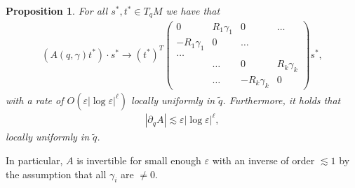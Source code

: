 \documentclass[JEP,XML,SOM,Unicode,published]{cedram}
\let\epsilon\varepsilon
\newtheorem{proposition}[theorem]{Proposition}
\theoremstyle{definition}
\let\de\partial
\let\eps\epsilon
\begin{document}
\begin{proposition}\label{conv A}
For all $s^*,t^*\in T_qM$ we have that
\begin{align*}(A(q,\gamma)t^*)\cdot s^*\to (t^*)^T\begin{pmatrix} 0 & R_1\gamma_1 &0 &\dots\\
-R_1\gamma_1 & 0 & \dots\\
\dots\\
 & \dots & 0 & R_k\gamma_k\\
 &\dots & -R_k\gamma_k & 0\end{pmatrix}s^*,
\end{align*}
with a rate of $O(\eps|{\log\eps}|^\ell)$ locally uniformly in $\tilde{q}$.
Furthermore, it holds that
\begin{align*}
\left|\de_q A\right|\lesssim \eps|{\log\eps}|^\ell,
\end{align*}
locally uniformly in $\tilde{q}$.
\end{proposition}
In particular, $A$ is invertible for small enough $\eps$ with an inverse of order $\lesssim 1$ by the assumption that all $\gamma_i$ are $\neq 0$.
\end{document}
